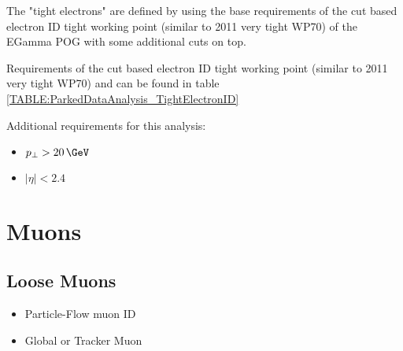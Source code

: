 
The "tight electrons" are defined by using the base requirements of the cut based electron ID tight working point (similar to 2011 very tight WP70) of the EGamma POG with some additional cuts on top.
  
Requirements of the cut based electron ID tight working point (similar to 2011 very tight WP70) and can be found in table \ref{TABLE:ParkedDataAnalysis_TightElectronID}



Additional requirements for this analysis:
\begin{itemize}
  \item $ p_{\perp} > 20\,\GeV$
  \item $ |\eta| < 2.4 $
\end{itemize}

\section{Muons}

\subsection{Loose Muons}

%

\begin{itemize}
  \item Particle-Flow muon ID
  \item Global or Tracker Muon
\end{itemize}


